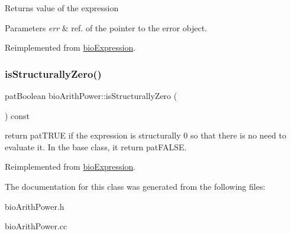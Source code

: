 \begin{DoxyReturn}{Returns}
value of the expression 
\end{DoxyReturn}

\begin{DoxyParams}{Parameters}
{\em err} & ref. of the pointer to the error object. \\
\hline
\end{DoxyParams}


Reimplemented from \hyperlink{classbio_expression_af58662a5d4d456f15bc4f2c9bd4f8a5b}{bio\+Expression}.

\mbox{\label{classbio_arith_power_a65021bc0ae804520ac1e64c665abc62a}} 
\subsubsection{\texorpdfstring{is\+Structurally\+Zero()}{isStructurallyZero()}}
{\footnotesize\ttfamily pat\+Boolean bio\+Arith\+Power\+::is\+Structurally\+Zero (\begin{DoxyParamCaption}{ }\end{DoxyParamCaption}) const\hspace{0.3cm}{\ttfamily [virtual]}}

return pat\+T\+R\+UE if the expression is structurally 0 so that there is no need to evaluate it. In the base class, it return pat\+F\+A\+L\+SE. 

Reimplemented from \hyperlink{classbio_expression_a264c6d78671610ada8261d698e4c4c42}{bio\+Expression}.



The documentation for this class was generated from the following files\+:\begin{DoxyCompactItemize}
\item 
bio\+Arith\+Power.\+h\item 
bio\+Arith\+Power.\+cc\end{DoxyCompactItemize}
